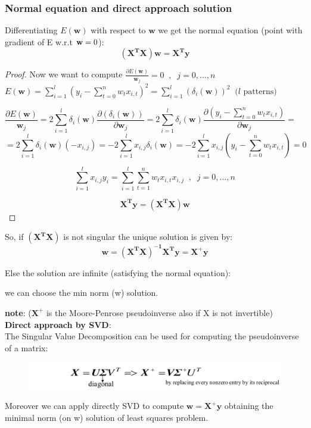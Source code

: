 \documentclass[../main.tex]{subfiles}
\begin{document}
\subsubsection{Normal equation and direct approach solution}
Differentiating $E(\mathbf{w})$ with respect to $\mathbf{w}$ we get the normal equation (point with gradient of E w.r.t $\bold{w} =0$):
$$ \mathbf{(X^TX)w = X^Ty}$$

\begin{proof} Now we want to compute $\frac{\partial E(\mathbf{w})}{\mathbf{w}_j} = 0 \;\; , \;\; j = 0, \dots, n$\\

$E(\mathbf{w}) = \sum_{i = 1}^{l}(y_i - \sum_{t = 0}^{n} w_t x_{i,t} )^2 =  \sum_{i = 1}^{l} (\delta_i(\mathbf{w}))^2 \;\;   \text{($l$ patterns)}$

$$\frac{\partial E(\mathbf{w})}{\mathbf{w}_j} = 2\sum_{i = 1}^{l} \delta_i(\mathbf{w}) \frac{\partial (\delta_i(\mathbf{w}))}{\partial \mathbf{w}_j} =   2\sum_{i = 1}^{l} \delta_i(\mathbf{w}) \frac{\partial (y_i - \sum_{t = 0}^{n} w_t x_{i,t} )}{\partial \mathbf{w}_j}=\quad  \quad$$
$$=2\sum_{i = 1}^{l} \delta_i(\mathbf{w}) (-x_{i,j}) = -2\sum_{i = 1}^{l} x_{i,j} \delta_i(\mathbf{w}) =
-2\sum_{i = 1}^{l} x_{i,j}(y_i - \sum_{t = 0}^{n} w_t x_{i,t} )  = 0
$$

$$\sum_{i = 1}^{l}x_{i,j}y_i = \sum_{i = 1}^{l}\sum_{t = 1}^{n} w_t x_{i,t} x_{i,j}  \;\; , \;\; j = 0, \dots, n$$

$$ \mathbf{X^Ty = (X^TX)w}$$
\end{proof}

So, if $ \mathbf{(X^TX)}$ is not singular the unique solution is given by:
$$ \mathbf{w = (X^TX)^{-1}X^Ty = X^+y} $$ 

Else the solution are infinite (satisfying the normal equation):
\begin{center}
    we can choose the min norm (w) solution.
\end{center}

\noindent\textbf{note}: ($\mathbf{X}^+$ is the Moore-Penrose pseudoinverse also if X is not invertible)\\

\noindent \textbf{Direct approach by SVD}:\\
The Singular Value Decomposition can be used for computing the pseudoinverse of a matrix:
\begin{figure}[H]
    \centering
    \includegraphics[scale = 0.2]{lectures/2_linear_model/2_direct_svd.png}
\end{figure}
Moreover we can apply directly SVD to compute $ \mathbf{w =X^+y} $ obtaining the minimal norm (on w) solution of least squares problem.
\end{document}
